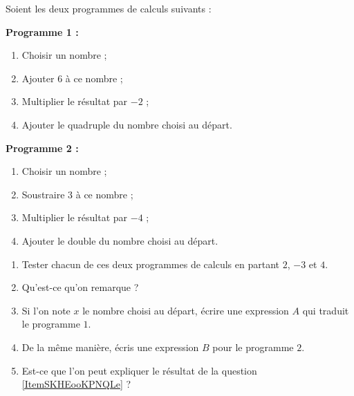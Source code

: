 
\begin{exercice}\label{exosmath-0807}

Soient les deux programmes de calculs suivants :

\begin{framed}
    {\bf Programme 1 :}
\begin{enumerate}
    \item
 Choisir un nombre ;
\item
 Ajouter $6$ à ce nombre ;
\item
 Multiplier le résultat par $-2$ ;
\item
 Ajouter le quadruple du nombre choisi au départ.
\end{enumerate}
\end{framed}
\begin{framed}
    {\bf Programme 2 :}
\begin{enumerate}
    \item
 Choisir un nombre ;
    \item
 Soustraire $3$ à ce nombre ;
    \item
 Multiplier le résultat par $-4$ ;
    \item
 Ajouter le double du nombre choisi au départ.
\end{enumerate}
\end{framed}

\begin{enumerate}
    \item
 Tester chacun de ces deux programmes de calculs en partant $2$, $-3$ et $4$.
\item   \label{ItemSKHEooKPNQLe}
    Qu'est-ce qu'on remarque ?
\item
 Si l'on note $x$ le nombre choisi au départ, écrire une expression $A$ qui traduit le programme $1$.
\item
 De la même manière, écris une expression $B$ pour le programme $2$.
\item
    Est-ce que l'on peut expliquer le résultat de la question \ref{ItemSKHEooKPNQLe} ?
\end{enumerate}

\end{exercice}
